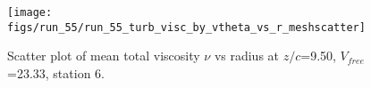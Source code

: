 \begin{figure}[H]
\centering
\texttt{[image: figs/run\_55/run\_55\_turb\_visc\_by\_vtheta\_vs\_r\_meshscatter]}
\caption{Scatter plot of mean total viscosity $\nu$ vs radius at $z/c$=9.50, $V_{free}$=23.33, station 6.}
\label{fig:run_55_turb_visc_by_vtheta_vs_r_meshscatter}
\end{figure}


